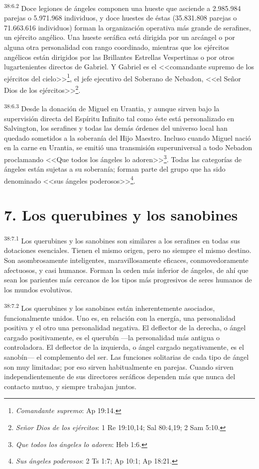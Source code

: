 \par
\textsuperscript{38:6.2} Doce legiones de ángeles componen una hueste que asciende a
2.985.984 parejas o 5.971.968 individuos, y doce huestes de éstas (35.831.808 parejas o 71.663.616 individuos) forman la organización operativa más grande de serafines, un ejército angélico. Una hueste seráfica está dirigida por un arcángel o por alguna otra personalidad con rango coordinado, mientras que los ejércitos angélicos están dirigidos por las Brillantes Estrellas Vespertinas o por otros lugartenientes directos de Gabriel. Y Gabriel es el <<comandante supremo de los ejércitos del cielo>>\footnote{\textit{Comandante supremo}: Ap 19:14.}, el jefe ejecutivo del Soberano de Nebadon, <<el Señor Dios de los ejércitos>>\footnote{\textit{Señor Dios de los ejércitos}: 1 Re 19:10,14; Sal 80:4,19; 2 Sam 5:10.}.

\par
\textsuperscript{38:6.3} Desde la donación de Miguel en Urantia, y aunque sirven bajo la supervisión directa del Espíritu Infinito tal como éste está personalizado en Salvington, los serafines y todas las demás órdenes del universo local han quedado sometidos a la soberanía del Hijo Maestro. Incluso cuando Miguel nació en la carne en Urantia, se emitió una transmisión superuniversal a todo Nebadon proclamando <<Que todos los ángeles lo adoren>>\footnote{\textit{Que todos los ángeles lo adoren}: Heb 1:6.}. Todas las categorías de ángeles están sujetas a su soberanía; forman parte del grupo que ha sido denominado <<sus ángeles poderosos>>\footnote{\textit{Sus ángeles poderosos}: 2 Ts 1:7; Ap 10:1; Ap 18:21.}.

\section*{7. Los querubines y los sanobines}
\par
\textsuperscript{38:7.1} Los querubines y los sanobines son similares a los serafines en todas sus dotaciones esenciales. Tienen el mismo origen, pero no siempre el mismo destino. Son asombrosamente inteligentes, maravillosamente eficaces, conmovedoramente afectuosos, y casi humanos. Forman la orden más inferior de ángeles, de ahí que sean los parientes más cercanos de los tipos más progresivos de seres humanos de los mundos evolutivos.

\par
\textsuperscript{38:7.2} Los querubines y los sanobines están inherentemente asociados, funcionalmente unidos. Uno es, en relación con la energía, una personalidad positiva y el otro una personalidad negativa. El deflector de la derecha, o ángel cargado positivamente, es el querubín ---la personalidad más antigua o controladora. El deflector de la izquierda, o ángel cargado negativamente, es el sanobín--- el complemento del ser. Las funciones solitarias de cada tipo de ángel son muy limitadas; por eso sirven habitualmente en parejas. Cuando sirven independientemente de sus directores seráficos dependen más que nunca del contacto mutuo, y siempre trabajan juntos.

